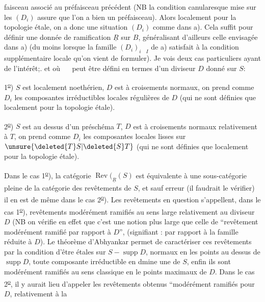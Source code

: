 faisceau associé au préfaisceau précédent (NB la condition canularesque mise sur les $(D_i)$ assure que l'on a bien un préfaisceau). Alors localement pour la topologie étale, on a donc une situation $(D_i)$ comme dans a). Cela suffit pour définir une donnée de ramification $\underline{R}$ sur $B$, généralisant d'ailleurs celle envisagée dans a) (du moins lorsque la famille $(D_i)_{i\quad I}$ de a) satisfait à la condition supplémentaire locale qu'on vient de formuler). Je vois deux cas particuliers ayant de l'intérêt;.  et  où $\quad$ peut être défini en termes d'un diviseur $D$ donné sur $S$:

1\textsuperscript{\uline{o}}) $S$ est localement noethérien, $D$ est à croisements normaux, on prend comme $D_i$ les composantes irréductibles locales régulières de $D$ (qui ne sont définies que localement pour la topologie étale).

2\textsuperscript{\uline{o}}) $S$ est au dessus d'un préschéma $T$, $D$ est à croisements normaux relativement à $T$, on prend comme $D_i$ les composantes locales lisses sur $\unsure{\deleted{T}S|\deleted{S}T}$ (qui ne sont définies que localement pour la topologie étale).

Dans le cas 1\textsuperscript{\uline{o}}), la catégorie $\operatorname{Rev}(_{\underline{R}}(S)$ est équivalente à une sous-catégorie pleine de la catégorie des revêtements de $S$, et sauf erreur (il faudrait le vérifier) il en est de même dans le cas 2\textsuperscript{\uline{o}}). Les revêtements en question s'appellent, dans le cas 1\textsuperscript{\uline{o}}), revêtements modérément ramifiés au sens large relativement au diviseur $D$ (NB on vérifie en effet que c'est une notion plus large que celle de ``revêtement modérément ramifié par rapport à $D$'', (signifiant : par rapport à la famille réduite à $D$). Le théorème d'Abhyankar permet de caractériser ces revêtements par la condition d'être étales sur  $S-\operatorname{supp}D$, normaux en les points au dessus de $\operatorname{supp}D$, toute composante irréductible en dmine une de $S$, enfin ils sont modérément ramifiés au sens classique en le points maximaux de $D$. Dans le cas 2\textsuperscript{\uline{o}}, il y aurait lieu d'appeler les revêtements obtenus ``modérément ramifiés pour $D$, relativement à la
